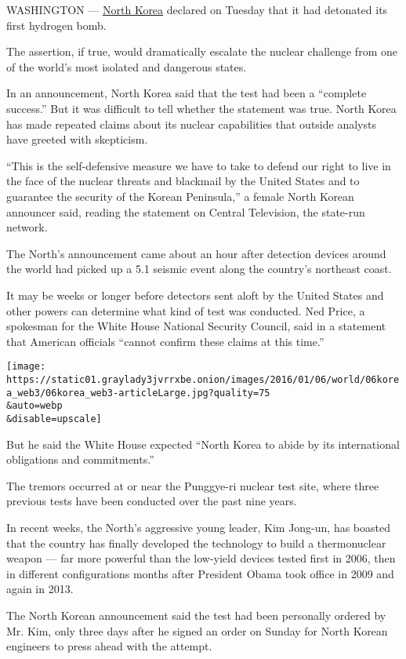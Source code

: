 WASHINGTON ---
\href{http://www.nytimes3xbfgragh.onion/2016/01/07/world/asia/north-korea-hydrogen-bomb-claim-reactions.html}{North
Korea} declared on Tuesday that it had detonated its first hydrogen
bomb.

The assertion, if true, would dramatically escalate the nuclear
challenge from one of the world's most isolated and dangerous states.

In an announcement, North Korea said that the test had been a ``complete
success.'' But it was difficult to tell whether the statement was true.
North Korea has made repeated claims about its nuclear capabilities that
outside analysts have greeted with skepticism.

``This is the self-defensive measure we have to take to defend our right
to live in the face of the nuclear threats and blackmail by the United
States and to guarantee the security of the Korean Peninsula,'' a female
North Korean announcer said, reading the statement on Central
Television, the state-run network.

The North's announcement came about an hour after detection devices
around the world had picked up a 5.1 seismic event along the country's
northeast coast.

It may be weeks or longer before detectors sent aloft by the United
States and other powers can determine what kind of test was conducted.
Ned Price, a spokesman for the White House National Security Council,
said in a statement that American officials ``cannot confirm these
claims at this time.''

\texttt{[image: https://static01.graylady3jvrrxbe.onion/images/2016/01/06/world/06korea\_web3/06korea\_web3-articleLarge.jpg?quality=75\\\&auto=webp\\\&disable=upscale]}

But he said the White House expected ``North Korea to abide by its
international obligations and commitments.''

The tremors occurred at or near the Punggye-ri nuclear test site, where
three previous tests have been conducted over the past nine years.

In recent weeks, the North's aggressive young leader, Kim Jong-un, has
boasted that the country has finally developed the technology to build a
thermonuclear weapon --- far more powerful than the low-yield devices
tested first in 2006, then in different configurations months after
President Obama took office in 2009 and again in 2013.

The North Korean announcement said the test had been personally ordered
by Mr. Kim, only three days after he signed an order on Sunday for North
Korean engineers to press ahead with the attempt.

